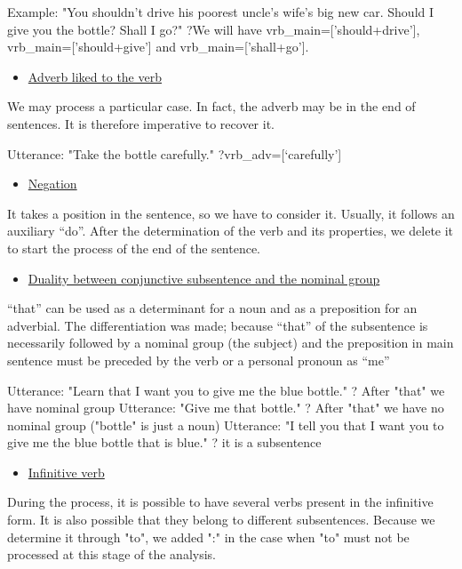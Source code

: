 \documentclass[twoside,a4paper,10pt]{report}
\begin{document}
\small
\begin{verbatimtab}
  Example: "You shouldn't drive his poorest uncle's wife's big new car. Should I give you the
bottle? Shall I go?"
  ?We will have vrb_main=['should+drive'], vrb_main=['should+give'] and vrb_main=['shall+go'].
\end{verbatimtab}
\normalsize

\begin{itemize}
    \item  \underline{Adverb liked to the verb}
\end{itemize}
We may process a particular case. In fact, the adverb may be in the end of sentences. It is therefore imperative to recover it.


\small
\begin{verbatimtab}
  Utterance: "Take the bottle carefully."
  ?vrb_adv=[‘carefully’]
\end{verbatimtab}
\normalsize

\begin{itemize}
    \item  \underline{Negation}
\end{itemize}
It takes a position in the sentence, so we have to consider it. Usually, it follows an auxiliary “do”. After the determination of the verb and its properties, we delete it to start the process of the end of the sentence.



\begin{itemize}
    \item  \underline{Duality between conjunctive subsentence and the nominal group}
\end{itemize}
“that” can be used as a determinant for a noun and as a preposition for an adverbial. The differentiation was made; because “that” of the subsentence is necessarily followed by a nominal group (the subject) and the preposition in main sentence must be preceded by the verb or a personal pronoun as “me”


\small
\begin{verbatimtab}
  Utterance: "Learn that I want you to give me the blue bottle." ? After "that" we have nominal
group
  Utterance: "Give me that bottle." ? After "that" we have no nominal group ("bottle" is just a
noun)
  Utterance: "I tell you that I want you to give me the blue bottle that is blue." ? it is a
subsentence
\end{verbatimtab}
\normalsize

\begin{itemize}
    \item  \underline{Infinitive verb}
\end{itemize}
During the process, it is possible to have several verbs present in the infinitive form. It is also possible that they belong to different subsentences. Because we determine it through "to", we added ":" in the case when "to" must not be processed at this stage of the analysis.
\end{document}
